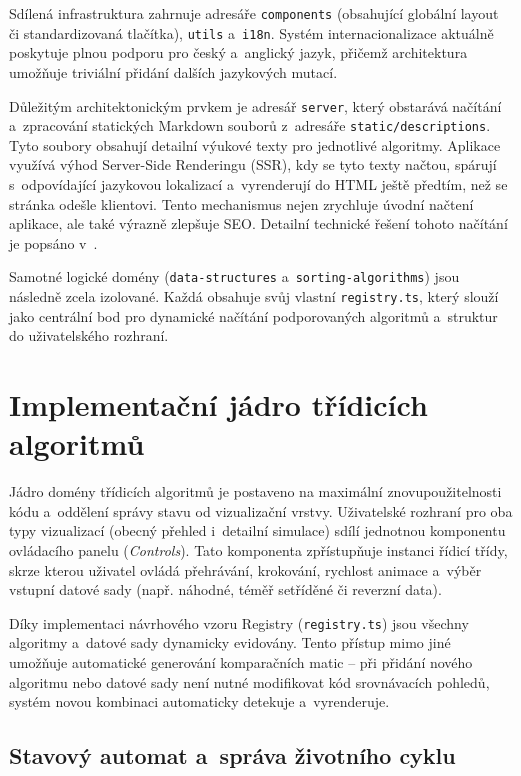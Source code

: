 Sdílená infrastruktura zahrnuje adresáře \texttt{components} (obsahující globální layout či standardizovaná tlačítka), \texttt{utils} a~\texttt{i18n}.
Systém internacionalizace aktuálně poskytuje plnou podporu pro český a~anglický jazyk, přičemž architektura umožňuje triviální přidání dalších jazykových mutací.

Důležitým architektonickým prvkem je adresář \texttt{server}, který obstarává načítání a~zpracování statických Markdown souborů z~adresáře \texttt{static/descriptions}.
Tyto soubory obsahují detailní výukové texty pro jednotlivé algoritmy.
Aplikace využívá výhod Server-Side Renderingu (SSR), kdy se tyto texty načtou, spárují s~odpovídající jazykovou lokalizací a~vyrenderují do HTML ještě předtím, než se stránka odešle klientovi.
Tento mechanismus nejen zrychluje úvodní načtení aplikace, ale také výrazně zlepšuje SEO.
Detailní technické řešení tohoto načítání je popsáno v~.

Samotné logické domény (\texttt{data-structures} a~\texttt{sorting-algorithms}) jsou následně zcela izolované.
Každá obsahuje svůj vlastní \texttt{registry.ts}, který slouží jako centrální bod pro dynamické načítání podporovaných algoritmů a~struktur do uživatelského rozhraní.

\section{Implementační jádro třídicích algoritmů}
\label{sec:sorting-core}

Jádro domény třídicích algoritmů je postaveno na maximální znovupoužitelnosti kódu a~oddělení správy stavu od vizualizační vrstvy.
Uživatelské rozhraní pro oba typy vizualizací (obecný přehled i~detailní simulace) sdílí jednotnou komponentu ovládacího panelu (\textit{Controls}).
Tato komponenta zpřístupňuje instanci řídicí třídy, skrze kterou uživatel ovládá přehrávání, krokování, rychlost animace a~výběr vstupní datové sady (např. náhodné, téměř setříděné či reverzní data).

Díky implementaci návrhového vzoru Registry (\texttt{registry.ts}) jsou všechny algoritmy a~datové sady dynamicky evidovány.
Tento přístup mimo jiné umožňuje automatické generování komparačních matic -- při přidání nového algoritmu nebo datové sady není nutné modifikovat kód srovnávacích pohledů, systém novou kombinaci automaticky detekuje a~vyrenderuje.

\subsection{Stavový automat a~správa životního cyklu}
\label{subsec:step-manager}

